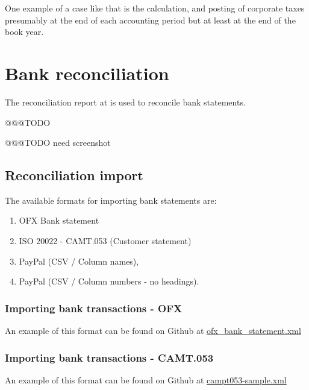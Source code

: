 One example of a case like that is the calculation, and posting of
corporate taxes presumably at the end of each accounting period but at least
at the end of the book year.


\section{Bank reconciliation}
\label{sec-business-processes-accounting-reconciliation}

The reconciliation report at  is used to reconcile bank statements.

@@@TODO

@@@TODO need screenshot

\subsection{Reconciliation import}
\label{subsec-business-processes-accounting-reconciliation}

The available formats for importing bank statements are:
\begin{enumerate}
\item OFX Bank statement
\item ISO 20022 - CAMT.053 (Customer statement)
\item PayPal (CSV / Column names),
\item PayPal (CSV / Column numbers - no headings).
\end{enumerate}

\subsubsection{Importing bank transactions - OFX}
\label{subsec-importing-bank-transactions-ofx}

An example of this format can be found on Github at
\href{https://github.com/ledgersmb/LedgerSMB/blob/master/t/data/inout_tests/ofx_bank_statement.xml}{ofx\_bank\_statement.xml}

\subsubsection{Importing bank transactions - CAMT.053}
\label{subsec-importing-bank-transactions-camt}

An example of this format can be found on Github at \href{https://github.com/ledgersmb/LedgerSMB/blob/master/t/data/inout_tests/campt053-sample.xml}{campt053-sample.xml}

